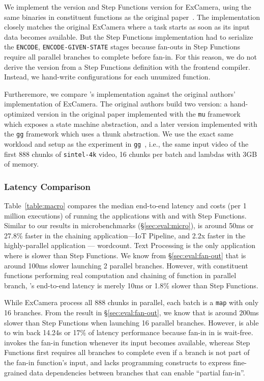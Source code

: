 \begin{itemize}
	We implement the \name{} version and Step Functions version for ExCamera,
	using the same binaries in constituent functions as the original
	paper~\cite{excamera-binary}. The \name{} implementation closely matches
	the original ExCamera where a task starts as soon as its input data
	becomes available. But the Step Functions implementation had to serialize
	the \texttt{ENCODE}, \texttt{ENCODE-GIVEN-STATE} stages because fan-outs
	in Step Functions require all parallel branches to complete before fan-in.
	For this reason, we do not derive the \name{} version from a Step
	Functions definition with the frontend compiler. Instead, we hand-write
	\name{} configurations for each unumized function.
	
	Furtheremore, we compare \name{}'s implementation against the original
	authors' implementation of ExCamera. The original authors build two
	version: a hand-optimized version in the original paper implemented with
	the \texttt{mu} framework which exposes a state machine abstraction, and a
	later version implemented with the \texttt{gg} framework which uses a
	thunk abstraction. We use the exact same workload and setup as the
	experiment in \texttt{gg}~\cite{gg-atc}, i.e., the same input video of the
	first 888 chunks of \texttt{sintel-4k} video, 16 chunks per batch and
	lambdas with 3GB of memory.
	
\end{itemize}

\subsubsection{Latency Comparison}

Table~\ref{table:macro} compares the median end-to-end latency and costs (per 1
million executions) of running the applications with \name{} and with Step
Functions. Similar to our results in microbenchmarks (\S\ref{sec:eval:micro}),
\name{} is around 50ms or 27.8\% faster in the chaining application---IoT
Pipeline, and 2.2x faster in the highly-parallel application --- wordcount.
Text Processing is the only application where \name{} is slower than Step
Functions. We know from \S\ref{sec:eval:fan-out} that \name{} is around 100ms
slower launching 2 parallel branches. However, with constituent  functions
performing real computation and chaining of function in parallel branch,
\name{}'s end-to-end latency is merely 10ms or 1.8\% slower than Step
Functions.

While ExCamera process all 888 chunks in parallel, each batch is a
\texttt{map} with only 16 branches. From the result in
\S\ref{sec:eval:fan-out}, we know that \name{} is around 200ms slower than
Step Functions when launching 16 parallel branches. However, \name{} is able
to win back 14.24s or 17\% of latency performance because fan-in in \name{} is
wait-free. \name{} invokes the fan-in function whenever its input becomes
available, whereas Step Functions first requires all branches to complete even
if a branch is not part of the fan-in function's input, and lacks programming
constructs to express fine-grained data dependencies between branches that can
enable ``partial fan-in''.

